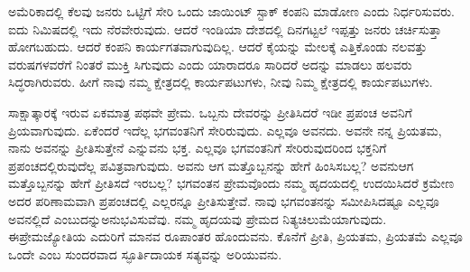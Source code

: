 ಅಮೆರಿಕಾದಲ್ಲಿ ಕೆಲವು ಜನರು ಒಟ್ಟಿಗೆ ಸೇರಿ ಒಂದು ಜಾಯಿಂಟ್​ ಸ್ಟಾಕ್​ ಕಂಪನಿ ಮಾಡೋಣ ಎಂದು ನಿರ್ಧರಿಸುವರು. ಐದು ನಿಮಿಷದಲ್ಲಿ ಇದು ನೆರವೇರುವುದು. ಆದರೆ ಇಂಡಿಯಾ ದೇಶದಲ್ಲಿ ದಿನಗಟ್ಟಲೆ ಇಪ್ಪತ್ತು ಜನರು ಚರ್ಚಿಸುತ್ತಾ ಹೋಗಬಹುದು. ಆದರೆ ಕಂಪನಿ ಕಾರ್ಯಗತವಾಗುವುದಿಲ್ಲ. ಆದರೆ ಕೈಯನ್ನು ಮೇಲಕ್ಕೆ ಎತ್ತಿಕೊಂಡು ನಲವತ್ತು ವರುಷಗಳವರೆಗೆ ನಿಂತರೆ ಮುಕ್ತಿ ಸಿಗುವುದು ಎಂದು ಯಾರಾದರೂ ಸಾರಿದರೆ ಅದನ್ನು ಮಾಡಲು ಹಲವರು ಸಿದ್ಧರಾಗಿರುವರು. ಹೀಗೆ ನಾವು ನಮ್ಮ ಕ್ಷೇತ್ರದಲ್ಲಿ ಕಾರ್ಯಪಟುಗಳು, ನೀವು ನಿಮ್ಮ ಕ್ಷೇತ್ರದಲ್ಲಿ ಕಾರ್ಯಪಟುಗಳು.

ಸಾಕ್ಷಾತ್ಕಾರಕ್ಕೆ ಇರುವ ಏಕಮಾತ್ರ ಪಥವೇ ಪ್ರೇಮ. ಒಬ್ಬನು ದೇವರನ್ನು ಪ್ರೀತಿಸಿದರೆ ಇಡೀ ಪ್ರಪಂಚ ಅವನಿಗೆ ಪ್ರಿಯವಾಗುವುದು. ಏಕೆಂದರೆ ಇದೆಲ್ಲ ಭಗವಂತನಿಗೆ ಸೇರಿರುವುದು. ಎಲ್ಲವೂ ಅವನದು. ಅವನೇ ನನ್ನ ಪ್ರಿಯತಮ, ನಾನು ಅವನನ್ನು ಪ್ರೀತಿಸುತ್ತೇನೆ ಎನ್ನುವನು ಭಕ್ತ. ಎಲ್ಲವೂ ಭಗವಂತನಿಗೆ ಸೇರಿರುವುದರಿಂದ ಭಕ್ತನಿಗೆ ಪ್ರಪಂಚದಲ್ಲಿರುವು\-ದೆಲ್ಲ ಪವಿತ್ರವಾಗುವುದು. ಅವನು ಆಗ ಮತ್ತೊಬ್ಬನನ್ನು ಹೇಗೆ ಹಿಂಸಿಸಬಲ್ಲ? ಅವನು\break ಆಗ ಮತ್ತೊಬ್ಬನನ್ನು ಹೇಗೆ ಪ್ರೀತಿಸದೆ ಇರಬಲ್ಲ? ಭಗವಂತನ ಪ್ರೇಮವೊಂದು ನಮ್ಮ ಹೃದಯದಲ್ಲಿ ಉದಯಿಸಿದರೆ ಕ್ರಮೇಣ ಅದರ ಪರಿಣಾಮವಾಗಿ ಪ್ರಪಂಚದಲ್ಲಿ ಎಲ್ಲರನ್ನೂ ಪ್ರೀತಿಸುತ್ತೇವೆ. ನಾವು ಭಗವಂತನನ್ನು ಸಮೀಪಿಸಿದಷ್ಟೂ ಎಲ್ಲವೂ ಅವನಲ್ಲಿದೆ ಎಂಬುದನ್ನು\break ಅನುಭವಿಸುವೆವು. ನಮ್ಮ ಹೃದಯವು ಪ್ರೇಮದ ನಿತ್ಯಚಿಲುಮೆಯಾಗುವುದು. ಈ\break ಪ್ರೇಮಜ್ಯೋತಿಯ ಎದುರಿಗೆ ಮಾನವ ರೂಪಾಂತರ ಹೊಂದುವನು. ಕೊನೆಗೆ ಪ್ರೀತಿ, ಪ್ರಿಯತಮ, ಪ್ರಿಯತಮೆ ಎಲ್ಲವೂ ಒಂದೇ ಎಂಬ ಸುಂದರವಾದ ಸ್ಫೂರ್ತಿದಾಯಕ ಸತ್ಯವನ್ನು ಅರಿಯುವನು.

